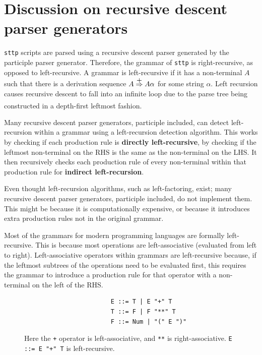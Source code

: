 \documentclass[]{full}
\theoremstyle{definition}
\begin{document}
\chapter{Discussion on recursive descent parser generators}
\label{chap:discussion}

\verb|sttp| scripts are parsed using a recursive descent parser generated by the participle parser generator. Therefore, the grammar of \verb|sttp| is right-recursive, as opposed to left-recursive. A grammar is left-recursive if it has a non-terminal $A$ such that there is a derivation sequence $A \stackrel{\mathclap{\normalfont\mbox{+}}}{\Rightarrow} A \alpha$ for some string $\alpha$. Left recursion causes recursive descent to fall into an infinite loop due to the parse tree being constructed in a depth-first leftmost fashion\textsuperscript{\cite{scott_johnstone_1998}}.

Many recursive descent parser generators, participle included, can detect left-recursion within a grammar using a left-recursion detection algorithm. This works by checking if each production rule is \textbf{directly left-recursive}, by checking if the leftmost non-terminal on the RHS is the same as the non-terminal on the LHS. It then recursively checks each production rule of every non-terminal within that production rule for \textbf{indirect left-recursion}.

Even thought left-recursion algorithms, such as left-factoring, exist; many recursive descent parser generators, participle included, do not implement them. This might be because it is computationally expensive, or because it introduces extra production rules not in the original grammar.

Most of the grammars for modern programming languages are formally left-recursive. This is because most operations are left-associative (evaluated from left to right). Left-associative operators within grammars are left-recursive because, if the leftmost subtrees of the operations need to be evaluated first, this requires the grammar to introduce a production rule for that operator with a non-terminal on the left of the RHS.

\begin{figure}[H]
    \begin{center}
        \begin{verbatim}
                        E ::= T | E "+" T
                        T ::= F | F "**" T
                        F ::= Num | "(" E ")"
        \end{verbatim}
    \end{center}
    \vspace{-1.5em}
    \cprotect\caption{\label{fig:4.1}Here the \verb|+| operator is left-associative, and \verb|**| is right-associative. \verb|E ::= E "+" T| is left-recursive.}
\end{figure}
\end{document}
